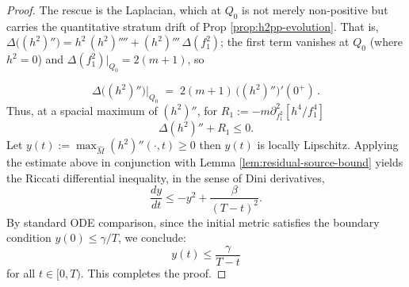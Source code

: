 \documentclass[11pt]{amsart}
\theoremstyle{plain}
\numberwithin{equation}{section}
\theoremstyle{definition}
\theoremstyle{remark}
\begin{document}
\begin{proof}
	The rescue is the Laplacian, which at $Q_0$ is not merely non-positive but carries the quantitative stratum drift of Prop \ref{prop:h2pp-evolution}. That is, $\Delta \big( ( h^2 )'' \big) = h^2\, ( h^2 )'''' + ( h^2 )'''\, \Delta ( f_1^2 )$; the first term vanishes at $Q_0$ (where $h^2 = 0$) and $\Delta ( f_1^2 ) |_{Q_0} = 2 ( m + 1 )$, so
	
	\[
	\Delta \big( ( h^2 )'' \big) \Big|_{Q_0} \;=\; 2 ( m + 1 )\, \big( ( h^2 )'' \big)' ( 0^+ ) \,.
	\]
	Thus, at a spacial maximum of $(h^2)''$, for $R_1 := -m \partial^2_{f_1^2}[ h^4/f_1^4 ]$
	\[\Delta(h^2)''+R_1\leq 0. \]
	Let $y(t) := \max_{\widehat{M}} (h^2)''(\cdot, t) \ge 0$ then  $y (t)$ is locally Lipschitz. Applying the estimate above in conjunction with Lemma \ref{lem:residual-source-bound}
	yields the Riccati differential inequality, in the sense of Dini derivatives,
	\begin{equation*}
		\frac{dy}{dt} \le -y^2 + \frac{\beta}{(T-t)^2}.
	\end{equation*}
	By standard ODE comparison, since the initial metric satisfies the boundary condition $y(0) \le \gamma / T$, we conclude:
	\begin{equation}
		y(t) \le \frac{\gamma}{T - t}
	\end{equation}
	for all $t \in [0, T)$. This completes the proof.
\end{proof}

\end{document}

